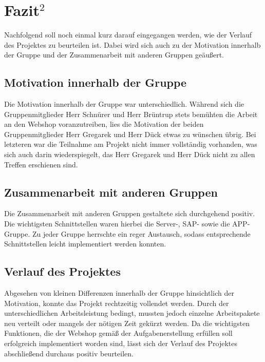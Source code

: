 \newpage
\section{Fazit$^2$}

Nachfolgend soll noch einmal kurz darauf eingegangen werden, wie der Verlauf des Projektes zu beurteilen ist. Dabei wird sich auch zu der Motivation innerhalb der Gruppe und der Zusammenarbeit mit anderen Gruppen geäußert.


\subsection{Motivation innerhalb der Gruppe}

Die Motivation innerhalb der Gruppe war unterschiedlich. Während sich die Gruppenmitglieder Herr Schnürer und Herr Brüntrup stets bemühten die Arbeit an den Webshop voranzutreiben, lies die Motivation der beiden Gruppenmitglieder Herr Gregarek und Herr Dück etwas zu wünschen übrig.  Bei letzteren war die Teilnahme am Projekt nicht immer vollständig vorhanden, was sich auch darin wiederspiegelt, das Herr Gregarek und Herr Dück nicht zu allen Treffen erschienen sind.

\subsection{Zusammenarbeit mit anderen Gruppen}
Die Zusammenarbeit mit anderen Gruppen gestaltete sich durchgehend positiv. Die wichtigsten Schnittstellen waren hierbei die Server-, SAP- sowie die APP-Gruppe. Zu jeder Gruppe herrschte ein reger Austausch, sodass entsprechende Schnittstellen leicht implementiert werden konnten.


\subsection{Verlauf des Projektes}

Abgesehen von kleinen Differenzen innerhalb der Gruppe hinsichtlich der Motivation, konnte das Projekt rechtzeitig vollendet werden. Durch der unterschiedlichen Arbeitsleistung bedingt, mussten jedoch einzelne Arbeitspakete neu verteilt oder mangels der nötigen Zeit gekürzt werden. Da die wichtigsten Funktionen, die der Webshop gemäß der Aufgabenerstellung erfüllen soll erfolgreich implementiert worden sind, lässt sich der Verlauf des Projektes abschließend durchaus positiv beurteilen.